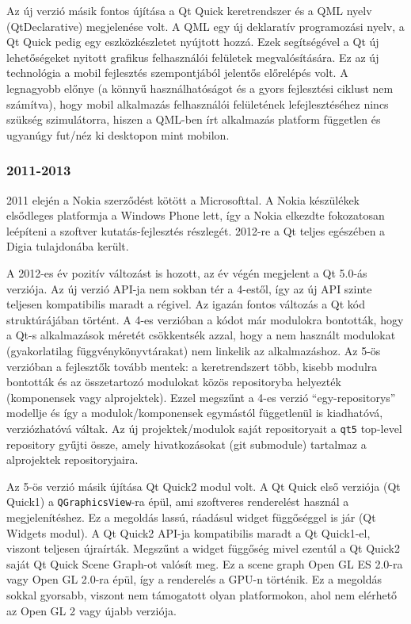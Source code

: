\documentclass[12pt]{report}
\begin{document}
Az új verzió másik fontos újítása a Qt Quick keretrendszer és a QML nyelv (QtDeclarative)
megjelenése volt. A QML egy új deklaratív programozási nyelv, a Qt Quick pedig egy
eszközkészletet nyújtott hozzá. Ezek segítségével a Qt új lehetőségeket nyitott grafikus
felhasználói felületek megvalósítására. Ez az új technológia a mobil fejlesztés szempontjából
jelentős előrelépés volt. A legnagyobb előnye (a könnyű használhatóságot és a gyors
fejlesztési ciklust nem számítva), hogy mobil alkalmazás felhasználói felületének
lefejlesztéséhez nincs szükség szimulátorra, hiszen a QML-ben írt alkalmazás
platform független és ugyanúgy fut/néz ki desktopon mint mobilon.

\subsubsection{2011-2013}
2011 elején a Nokia szerződést kötött a Microsofttal. A Nokia készülékek elsődleges
platformja a Windows Phone lett, így a Nokia elkezdte fokozatosan leépíteni a
szoftver kutatás-fejlesztés részlegét. 2012-re a Qt teljes egészében a Digia
tulajdonába került.

A 2012-es év pozitív változást is hozott, az év végén megjelent a Qt 5.0-ás verziója.
Az új verzió API-ja nem sokban tér a 4-estől, így az új API szinte teljesen kompatibilis
maradt a régivel. Az igazán fontos változás a Qt kód struktúrájában történt.
A 4-es verzióban a kódot már modulokra bontották, hogy a Qt-s alkalmazások méretét
csökkentsék azzal, hogy a nem használt modulokat (gyakorlatilag függvénykönyvtárakat) nem
linkelik az alkalmazáshoz.
Az 5-ös verzióban a fejlesztők tovább mentek: a keretrendszert több,
kisebb modulra bontották és az összetartozó modulokat közös repositoryba helyezték
(komponensek vagy alprojektek). Ezzel megszűnt a 4-es verzió ``egy-repositorys'' modellje
és így a modulok/komponensek egymástól függetlenül is kiadhatóvá, verziózhatóvá váltak.
Az új projektek/modulok saját repositoryait a \texttt{qt5} top-level repository gyűjti össze,
amely hivatkozásokat (git submodule) tartalmaz a alprojektek repositoryjaira.

Az 5-ös verzió másik újítása Qt Quick2 modul volt. A Qt Quick első verziója (Qt Quick1) a
\texttt{QGraphicsView}-ra épül, ami szoftveres renderelést használ a megjelenítéshez.
Ez a megoldás lassú, ráadásul widget függőséggel is jár (Qt Widgets modul).
A Qt Quick2 API-ja kompatibilis maradt a Qt Quick1-el, viszont teljesen újraírták.
Megszűnt a widget függőség mivel ezentúl a Qt Quick2 saját Qt Quick Scene Graph-ot valósít
meg. Ez a scene graph Open GL ES 2.0-ra vagy Open GL 2.0-ra épül, így a renderelés a GPU-n
történik. Ez a megoldás sokkal gyorsabb, viszont nem támogatott olyan platformokon, ahol
nem elérhető az Open GL 2 vagy újabb verziója.
\end{document}
